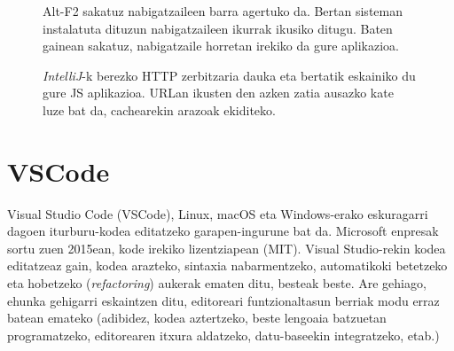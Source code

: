 \begin{figure}[ht]
	\centering
{}
\caption{Alt-F2 sakatuz nabigatzaileen barra agertuko da. Bertan sisteman instalatuta dituzun nabigatzaileen ikurrak ikusiko ditugu. Baten gainean sakatuz, nabigatzaile horretan irekiko da gure aplikazioa.}
\label{fig:nabigatzaileak}
\end{figure}

\begin{figure}[hb]
	\centering
{}
\caption{\textit{IntelliJ}-k berezko HTTP zerbitzaria dauka eta bertatik eskainiko du gure JS aplikazioa. URLan ikusten den azken zatia ausazko kate luze bat da, cachearekin arazoak ekiditeko.}
\label{fig:emaitza}
\end{figure}


\section{VSCode} 

Visual Studio Code (VSCode), Linux, macOS eta Windows-erako eskuragarri dagoen iturburu-kodea editatzeko garapen-ingurune bat da. Microsoft enpresak sortu zuen 2015ean, kode irekiko lizentziapean (MIT). Visual Studio-rekin kodea editatzeaz gain, kodea arazteko, sintaxia nabarmentzeko, automatikoki betetzeko eta hobetzeko (\textit{refactoring}) aukerak ematen ditu, besteak beste. Are gehiago, ehunka gehigarri eskaintzen ditu, editoreari funtzionaltasun berriak modu erraz batean emateko (adibidez, kodea aztertzeko, beste lengoaia batzuetan programatzeko, editorearen itxura aldatzeko, datu-baseekin integratzeko, etab.)

